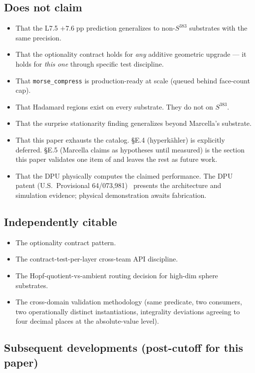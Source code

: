 \documentclass[11pt,letterpaper]{article}
\begin{document}
\subsection{Does not claim}
\begin{itemize}[nosep]
\item That the L7.5 $+7.6\;\text{pp}$ prediction generalizes to
  non-$S^{383}$ substrates with the same precision.
\item That the optionality contract holds for \emph{any} additive
  geometric upgrade --- it holds for \emph{this one} through specific
  test discipline.
\item That \texttt{morse\_compress} is production-ready at scale
  (queued behind face-count cap).
\item That Hadamard regions exist on every substrate. They do not on
  $S^{383}$.
\item That the surprise stationarity finding generalizes beyond
  Marcella's substrate.
\item That this paper exhausts the catalog. \S E.4 (hyperk\"ahler)
  is explicitly deferred. \S E.5 (Marcella claims as hypotheses
  until measured) is the section this paper validates one item of
  and leaves the rest as future work.
\item That the DPU physically computes the claimed performance. The
  DPU patent (U.S.\ Provisional 64/073,981)~\cite{davis2026dpu}
  presents the architecture and simulation evidence; physical
  demonstration awaits fabrication.
\end{itemize}

\subsection{Independently citable}
\begin{itemize}[nosep]
\item The optionality contract pattern.
\item The contract-test-per-layer cross-team API discipline.
\item The Hopf-quotient-vs-ambient routing decision for high-dim
  sphere substrates.
\item The cross-domain validation methodology (same predicate, two
  consumers, two operationally distinct instantiations, integrality
  deviations agreeing to four decimal places at the absolute-value
  level).
\end{itemize}

\subsection{Subsequent developments (post-cutoff for this paper)}
\end{document}
